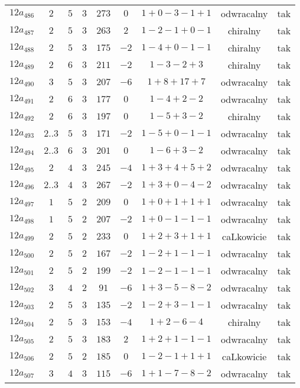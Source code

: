 \begin{longtable}{ccccccccc}
$12a_{486}$ & $2$ & $5$ & $3$ & $273$ & $0$ & $1+0-3-1+1$ & odwracalny & tak \\
$12a_{487}$ & $2$ & $5$ & $3$ & $263$ & $2$ & $1-2-1+0-1$ & chiralny & tak \\
$12a_{488}$ & $2$ & $5$ & $3$ & $175$ & $-2$ & $1-4+0-1-1$ & chiralny & tak \\
$12a_{489}$ & $2$ & $6$ & $3$ & $211$ & $-2$ & $1-3-2+3$ & chiralny & tak \\
$12a_{490}$ & $3$ & $5$ & $3$ & $207$ & $-6$ & $1+8+17+7$ & odwracalny & tak \\
$12a_{491}$ & $2$ & $6$ & $3$ & $177$ & $0$ & $1-4+2-2$ & odwracalny & tak \\
$12a_{492}$ & $2$ & $6$ & $3$ & $197$ & $0$ & $1-5+3-2$ & chiralny & tak \\
$12a_{493}$ & $2..3$ & $5$ & $3$ & $171$ & $-2$ & $1-5+0-1-1$ & odwracalny & tak \\
$12a_{494}$ & $2..3$ & $6$ & $3$ & $201$ & $0$ & $1-6+3-2$ & odwracalny & tak \\
$12a_{495}$ & $2$ & $4$ & $3$ & $245$ & $-4$ & $1+3+4+5+2$ & odwracalny & tak \\
$12a_{496}$ & $2..3$ & $4$ & $3$ & $267$ & $-2$ & $1+3+0-4-2$ & odwracalny & tak \\
$12a_{497}$ & $1$ & $5$ & $2$ & $209$ & $0$ & $1+0+1+1+1$ & odwracalny & tak \\
$12a_{498}$ & $1$ & $5$ & $2$ & $207$ & $-2$ & $1+0-1-1-1$ & odwracalny & tak \\
$12a_{499}$ & $2$ & $5$ & $2$ & $233$ & $0$ & $1+2+3+1+1$ & caLkowicie & tak \\
$12a_{500}$ & $2$ & $5$ & $2$ & $167$ & $-2$ & $1-2+1-1-1$ & odwracalny & tak \\
$12a_{501}$ & $2$ & $5$ & $2$ & $199$ & $-2$ & $1-2-1-1-1$ & odwracalny & tak \\
$12a_{502}$ & $3$ & $4$ & $2$ & $91$ & $-6$ & $1+3-5-8-2$ & odwracalny & tak \\
$12a_{503}$ & $2$ & $5$ & $3$ & $135$ & $-2$ & $1-2+3-1-1$ & odwracalny & tak \\
$12a_{504}$ & $2$ & $5$ & $3$ & $153$ & $-4$ & $1+2-6-4$ & chiralny & tak \\
$12a_{505}$ & $2$ & $5$ & $3$ & $183$ & $2$ & $1+2+1-1-1$ & odwracalny & tak \\
$12a_{506}$ & $2$ & $5$ & $2$ & $185$ & $0$ & $1-2-1+1+1$ & caLkowicie & tak \\
$12a_{507}$ & $3$ & $4$ & $3$ & $115$ & $-6$ & $1+1-7-8-2$ & odwracalny & tak \\

\end{longtable}
